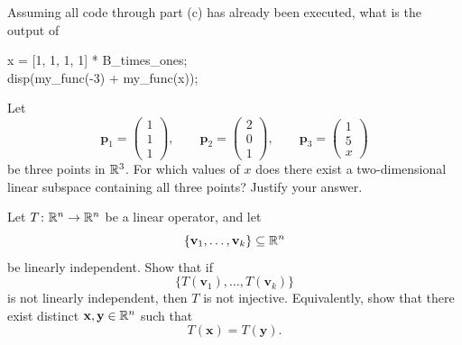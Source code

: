 \documentclass[11pt,oneside]{article}
\begin{document}
\begin{problem}
\begin{problemsubparts}[resume]
\item Assuming all code through part \textup{(c)} has already been executed, what is the output of

{\small\ttfamily
\begin{tabbing}
x = [1, 1, 1, 1] * B\_times\_ones;\\
disp(my\_func(-3) + my\_func(x));
\end{tabbing}
}
\end{problemsubparts}
\end{problem}

\begin{problem}
Let
\[
\mathbf p_1=
\begin{pmatrix}1\\1\\1\end{pmatrix},
\qquad
\mathbf p_2=
\begin{pmatrix}2\\0\\1\end{pmatrix},
\qquad
\mathbf p_3=
\begin{pmatrix}1\\5\\x\end{pmatrix}
\]
be three points in $\mathbb{R}^3$. For which values of $x$ does there exist a two-dimensional linear subspace containing all three points? Justify your answer.
\end{problem}

\begin{problem}
Let $T\colon\mathbb{R}^n\to\mathbb{R}^n$ be a linear operator, and let
\[
\{\mathbf v_1,\dots,\mathbf v_k\}\subseteq\mathbb{R}^n
\]
be linearly independent. Show that if
\[
\{T(\mathbf v_1),\dots,T(\mathbf v_k)\}
\]
is not linearly independent, then $T$ is not injective. Equivalently, show that there exist distinct $\mathbf x,\mathbf y\in\mathbb{R}^n$ such that
\[
T(\mathbf x)=T(\mathbf y).
\]
\end{problem}
\end{document}
